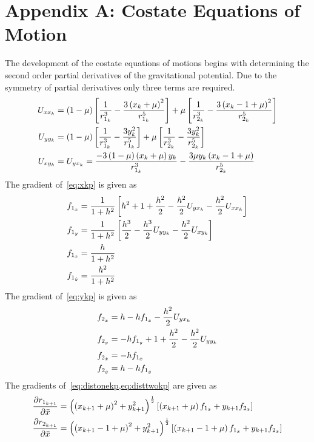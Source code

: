 \documentclass[letterpaper, preprint, paper,11pt]{AAS}	%
\begin{document}
\section*{Appendix A: Costate Equations of Motion}\label{sec:costate_appendix}
The development of the costate equations of motions begins with determining the second order partial derivatives of the gravitational potential. 
Due to the symmetry of partial derivatives only three terms are required.
\begin{align}\label{eq:second_discrete_potential_grad}
	U_{x\xk} &= \parenth{1-\mu} \bracket{\frac{1}{\distonek^3} - \frac{3 \parenth{\xk +\mu}^2}{\distonek^5}} + \mu \bracket{\frac{1}{\disttwok^3} - \frac{3 \parenth{\xk -1 + \mu}^2}{\disttwok^5}} \\
	U_{y\yk} &= \parenth{1-\mu} \bracket{\frac{1}{\distonek^3} - \frac{3 \yk^2}{\distonek^5}} + \mu \bracket{\frac{1}{\disttwok^3} - \frac{3 \yk^2}{\disttwok^5}} \\
	U_{x\yk} &= U_{y\xk} =  \frac{-3 \parenth{1-\mu} \parenth{\xk +\mu} \yk}{\distonek^3} - \frac{3\mu\yk\parenth{\xk-1+\mu}}{\disttwok^5}
\end{align}
The gradient of~\cref{eq:xkp} is given as
\begin{subequations}\label{eq:xkp_grad}
\begin{align}
	f_{1_x} &= \frac{1}{1+h^2} \left[ h^2 + 1 + \frac{h^2}{2} -\frac{h^2}{2} U_{yx_k} - \frac{h^2}{2}U_{xx_k} \right] \\
	f_{1_y} &= \frac{1}{1+h^2} \left[  \frac{h^3}{2} -\frac{h^3}{2} U_{yy_{k}} - \frac{h^2}{2}U_{xy_{k}} \right] \\
	f_{1_{\dot{x}}} &= \frac{h}{1+h^2} \\
	f_{1_{\dot{y}}} &= \frac{h^2}{1+h^2} 
\end{align}
\end{subequations}
The gradient of~\cref{eq:ykp} is given as
\begin{subequations}\label{eq:ykp_grad}
\begin{align}
	f_{2_x} &= h -h f_{1_x} - \frac{h^2}{2} U_{yx_k} \\
	f_{2_y} &= -h f_{1_y} + 1 + \frac{h^2}{2} - \frac{h^2}{2} U_{yy_{k}} \\
	f_{2_{\dot{x}}} &= -h f_{1_{\dot{x}}} \\
	f_{2_{\dot{y}}} &= h - h f_{1_{\dot{y}}} 
\end{align}
\end{subequations}
The gradients of~\cref{eq:distonekp,eq:disttwokp} are given as
\begin{subequations}\label{eq:distkp_grad}
\begin{align}
	\frac{\partial r_{1_{k+1}}}{\partial \bar{x}} &= \left( \left( x_{k+1} + \mu\right)^2 + y_{k+1}^2 \right)^{\frac{1}{2}} \left[ \left( x_{k+1} + \mu \right) f_{1_{\bar{x}}} + y_{k+1} f_{2_{\bar{x}}} \right] \\
	\frac{\partial r_{2_{k+1}}}{\partial \bar{x}} &= \left( \left( x_{k+1} - 1 + \mu\right)^2 + y_{k+1}^2 \right)^{\frac{1}{2}} \left[ \left( x_{k+1} -1 + \mu \right) f_{1_{\bar{x}}} + y_{k+1} f_{2_{\bar{x}}} \right] 
\end{align}
\end{subequations}
\end{document}
